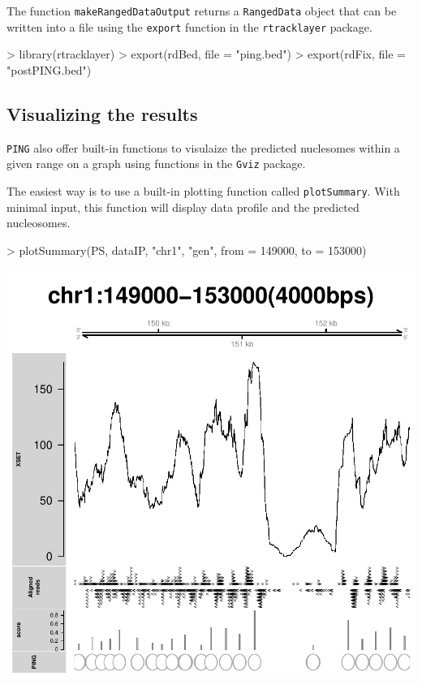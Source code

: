 \documentclass[11pt]{article}
\begin{document}
The function \texttt{makeRangedDataOutput} returns a \texttt{RangedData} object that can be written into a file using
the \texttt{export} function in the \texttt{rtracklayer} package.
\begin{Schunk}
\begin{Sinput}
> library(rtracklayer)
> export(rdBed, file = "ping.bed")
> export(rdFix, file = "postPING.bed")
\end{Sinput}
\end{Schunk}

\subsection{Visualizing the results}
\texttt{PING} also offer built-in functions to visulaize the predicted nuclesomes within a given range on a graph using functions in the \texttt{Gviz} package.

The easiest way is to use a built-in plotting function called \texttt{plotSummary}. With minimal input, this function will display data profile and the predicted nucleosomes.
\begin{Schunk}
\begin{Sinput}
> plotSummary(PS, dataIP, "chr1", "gen", from = 149000, to = 153000)
\end{Sinput}
\end{Schunk}
\includegraphics{PING-plotSummary}
\end{document}
